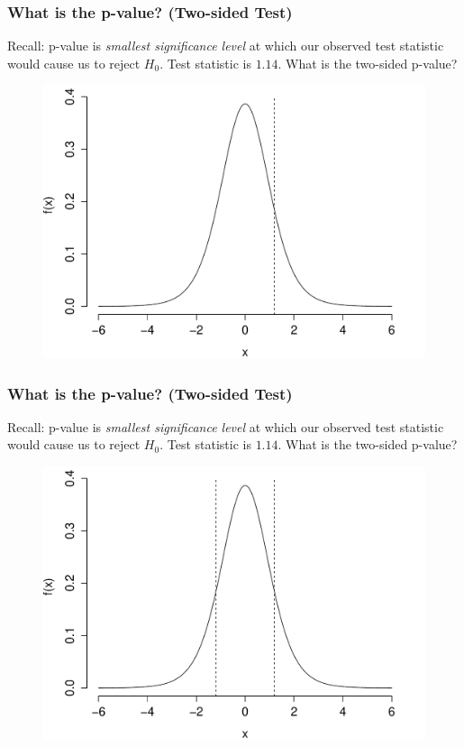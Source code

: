 \begin{frame}
\frametitle{What is the p-value? (Two-sided Test)}
\footnotesize
Recall: p-value is \emph{smallest significance level} at which our observed test statistic would cause us to reject $H_0$. \alert{Test statistic is $1.14$. What is the two-sided p-value? }
\begin{figure}
\includegraphics[scale= 0.4]{./images/p_both2}

\end{figure}

\end{frame}

\begin{frame}
\frametitle{What is the p-value? (Two-sided Test)}
\footnotesize
Recall: p-value is \emph{smallest significance level} at which our observed test statistic would cause us to reject $H_0$. \alert{Test statistic is $1.14$. What is the two-sided p-value? }
\begin{figure}
\includegraphics[scale= 0.4]{./images/p_both3}

\end{figure}

\end{frame}

